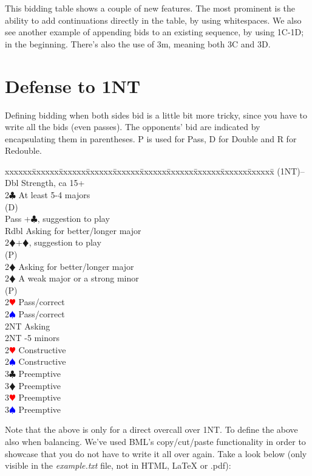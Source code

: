 \documentclass[a4paper]{article}
\newcommand{\BC}{\textcolor{OliveGreen}{$\clubsuit$}}
\newcommand{\BD}{\textcolor{RedOrange}{$\vardiamondsuit$}}
\newcommand{\BH}{\textcolor{Red}{$\varheartsuit${}}}
\newcommand{\BS}{\textcolor{Blue}{$\spadesuit${}}}
\newenvironment{bidtable}
{\begin{tabbing}

xxxxxx\=xxxxxx\=xxxxxx\=xxxxxx\=xxxxxx\=xxxxxx\=xxxxxx\=xxxxxx\=xxxxxx\=xxxxxx\=\kill}
{\end{tabbing} }%
\begin{document}
This bidding table shows a couple of new features. The most
prominent is the ability to add continuations directly in the
table, by using whitespaces. We also see another example of
appending bids to an existing sequence, by using 1C-1D; in the
beginning. There's also the use of 3m, meaning both 3C and 3D.

\section{Defense to 1NT}

Defining bidding when both sides bid is a little bit more tricky,
since you have to write all the bids (even passes). The opponents'
bid are indicated by encapsulating them in parentheses. P is used
for Pass, D for Double and R for Redouble.

\begin{bidtable}
(1NT)--\+\\
Dbl \> Strength, ca 15+\\
2\BC \> At least 5-4 majors\+\\
(D)\+\\
Pass +\BC , suggestion to play\\
Rdbl \> Asking for better/longer major\\
2\BD {}+\BD , suggestion to play\-\\
(P)\+\\
2\BD \> Asking for better/longer major\-\-\\
2\BD \> A weak major or a strong minor\+\\
(P)\+\\
2\BH \> Pass/correct\\
2\BS \> Pass/correct\\
2NT \> Asking\-\-\\
2NT -5 minors\\
2\BH \> Constructive\\
2\BS \> Constructive\\
3\BC \> Preemptive\\
3\BD \> Preemptive\\
3\BH \> Preemptive\\
3\BS \> Preemptive\-
\end{bidtable}

Note that the above is only for a direct overcall over 1NT. To
define the above also when balancing. We've used BML's
copy/cut/paste functionality in order to showcase that you do not
have to write it all over again. Take a look below (only visible in
the \emph{example.txt} file, not in HTML, LaTeX or .pdf):
\end{document}
